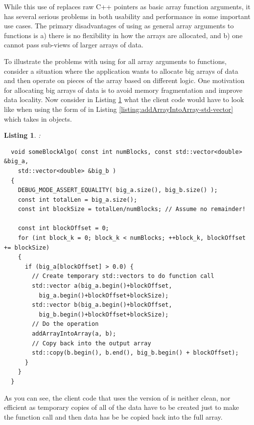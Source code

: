 \documentclass[pdf,ps2pdf,11pt]{SANDreport}
\newtheorem{listing}{Listing}
\begin{document}
While this use of {} replaces raw C++ pointers as
basic array function arguments, it has several serious problems in
both usability and performance in some important use cases.  The
primary disadvantages of using {} as general array
arguments to functions is a) there is no flexibility in how the arrays
are allocated, and b) one cannot pass sub-views of larger arrays of
data.

To illustrate the problems with using {} for all
array arguments to functions, consider a situation where the
application wants to allocate big arrays of data and then operate on
pieces of the array based on different logic.  One motivation for
allocating big arrays of data is to avoid memory fragmentation and
improve data locality.  Now consider in Listing
{}\ref{listing:someBlockAlgo-std-vector} what the client code would
have to look like when using the form of
{} in Listing
{}\ref{listing:addArrayIntoArray-std-vector} which takes in
{} objects.

\begin{listing}:\\
\label{listing:someBlockAlgo-std-vector}
{\small\begin{verbatim}
  void someBlockAlgo( const int numBlocks, const std::vector<double> &big_a,
    std::vector<double> &big_b )
  {
    DEBUG_MODE_ASSERT_EQUALITY( big_a.size(), big_b.size() );
    const int totalLen = big_a.size();
    const int blockSize = totalLen/numBlocks; // Assume no remainder!
    
    const int blockOffset = 0;
    for (int block_k = 0; block_k < numBlocks; ++block_k, blockOffset += blockSize)
    {
      if (big_a[blockOffset] > 0.0) {
        // Create temporary std::vectors to do function call
        std::vector a(big_a.begin()+blockOffset,
          big_a.begin()+blockOffset+blockSize);
        std::vector b(big_a.begin()+blockOffset,
          big_b.begin()+blockOffset+blockSize);
        // Do the operation
        addArrayIntoArray(a, b);
        // Copy back into the output array
        std::copy(b.begin(), b.end(), big_b.begin() + blockOffset);
      }
    }
  }
\end{verbatim}}
\end{listing}

As you can see, the client code that uses the {}
version of {} is neither clean, nor
efficient as temporary copies of all of the data have to be created
just to make the function call and then data has be be copied back
into the full array.
\end{document}
